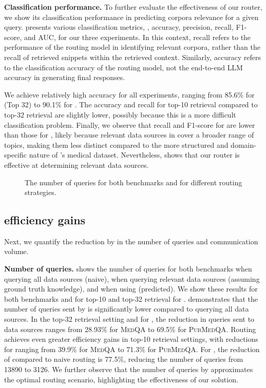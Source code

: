 \textbf{Classification performance.}
To further evaluate the effectiveness of our router, we show its classification performance in predicting corpora relevance for a given query.
 presents various classification metrics, \ie, accuracy, precision, recall, F1-score, and AUC, for our three experiments.
In this context, recall refers to the performance of the routing model in identifying relevant corpora, rather than the recall of retrieved snippets within the retrieved context.
Similarly, accuracy refers to the classification accuracy of the routing model, not the end-to-end \ac{LLM} accuracy in generating final responses.

We achieve relatively high accuracy for all experiments, ranging from 85.6\% for \mirage (Top 32) to 90.1\% for \mmlu.
The accuracy and recall for top-10 retrieval compared to top-32 retrieval are slightly lower, possibly because this is a more difficult classification problem.
Finally, we observe that recall and F1-score for \mmlu are lower than those for \mirage, likely because relevant data sources in \mmlu cover a broader range of topics, making them less distinct compared to the more structured and domain-specific nature of \mirage's medical dataset.
Nevertheless,  shows that our router is effective at determining relevant data sources.

\begin{figure}[t]
	\centering
	\caption{The number of queries for both benchmarks and for different routing strategies.}
	\label{fig:communication}
\end{figure}

\subsection{\sys efficiency gains}
\label{sec:exp_efficiency}
Next, we quantify the reduction by \sys in the number of queries and communication volume.

\textbf{Number of queries.}
 shows the number of queries for both benchmarks when querying all data sources (naive), when querying relevant data sources (assuming ground truth knowledge), and when using \sys (predicted).
We show these results for both benchmarks and for top-10 and top-32 retrieval for \mirage.
 demonstrates that the number of queries sent by \sys is significantly lower compared to querying all data sources.
In the top-32 retrieval setting and for \mirage, the reduction in queries sent to data sources ranges from 28.93\% for \textsc{MedQA} to 69.5\% for \textsc{PubMedQA}.
Routing achieves even greater efficiency gains in top-10 retrieval settings, with reductions for \mirage ranging from 39.9\% for \textsc{MedQA} to 71.3\% for \textsc{PubMedQA}.
For \mmlu, the reduction of \sys compared to naive routing is 77.5\%, reducing the number of queries from \num{13890} to \num{3126}.
We further observe that the number of queries by \sys approximates the optimal routing scenario, highlighting the effectiveness of our solution.



